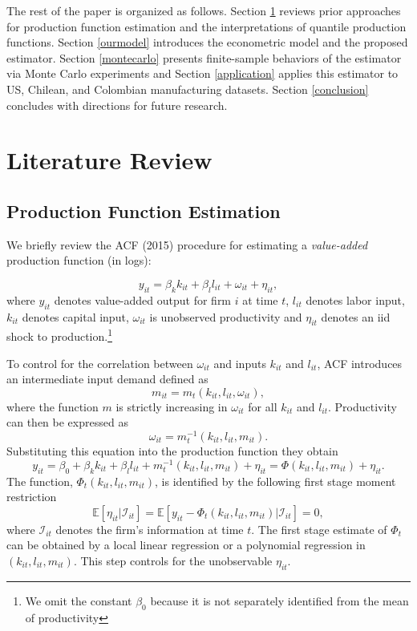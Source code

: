 \documentclass[11pt]{article}
\begin{document}
The rest of the paper is organized as follows. Section \ref{litreview} reviews prior approaches for production function estimation and the interpretations of quantile production functions. Section \ref{ourmodel} introduces the econometric model and the proposed estimator. Section \ref{montecarlo} presents finite-sample behaviors of the estimator via Monte Carlo experiments and Section \ref{application} applies this estimator to US, Chilean, and Colombian manufacturing datasets. Section \ref{conclusion} concludes with directions for future research.

\section{Literature Review} \label{litreview}
\subsection{Production Function Estimation}

We briefly review the ACF (2015) procedure for estimating a \textit{value-added} production function (in logs):

\begin{equation}
y_{it}=\beta_{k}k_{it}+\beta_{l}l_{it}+\omega_{it}+\eta_{it},
\end{equation}
where $y_{it}$ denotes value-added output for firm $i$ at time $t$, $l_{it}$ denotes labor input, $k_{it}$ denotes capital input, $\omega_{it}$ is unobserved productivity and $\eta_{it}$ denotes an iid shock to production.\footnote{We omit the constant $\beta_{0}$ because it is not separately identified from the mean of productivity}

To control for the correlation between $\omega_{it}$ and inputs $k_{it}$ and $l_{it}$, ACF introduces an intermediate input demand defined as
\begin{equation}
m_{it}=m_{t}(k_{it}, l_{it}, \omega_{it}),
\end{equation}
where the function $m$ is strictly increasing in $\omega_{it}$ for all $k_{it}$ and $l_{it}$. Productivity can then be expressed as
\begin{equation}
\omega_{it}=m_{t}^{-1}(k_{it}, l_{it}, m_{it}).
\end{equation}
Substituting this equation into the production function they obtain
\begin{equation}
y_{it}=\beta_{0}+\beta_{k}k_{it}+\beta_{l}l_{it}+m^{-1}_{t}(k_{it}, l_{it}, m_{it})+\eta_{it}=\Phi(k_{it}, l_{it}, m_{it})+\eta_{it}.
\end{equation}
The function, $\Phi_{t}(k_{it}, l_{it}, m_{it})$, is identified by the following first stage moment restriction
\begin{equation}
\mathbb{E}[\eta_{it}|\mathcal{I}_{it}]=\mathbb{E}[y_{it}-\Phi_{t}(k_{it}, l_{it}, m_{it})|\mathcal{I}_{it}]=0,
\end{equation}
where $\mathcal{I}_{it}$ denotes the firm's information at time $t$. The first stage estimate of $\Phi_{t}$ can be obtained by a local linear regression or a polynomial regression in $(k_{it}, l_{it}, m_{it})$. This step controls for the unobservable $\eta_{it}$.
\end{document}
